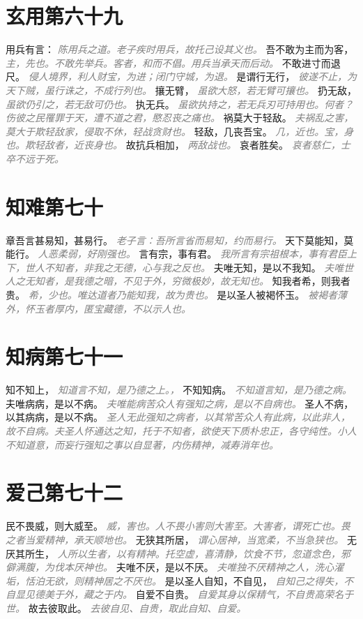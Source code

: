 \documentclass[a4paper,zihao=-4,oneside,landscape,UTF8]{ctexart}
\newcommand{\zhushi}[1]{\scriptsize{\textit{\textcolor{gray}{#1}}}\normalsize}
\begin{document}
\section{玄用第六十九}

用兵有言：
\zhushi{陈用兵之道。老子疾时用兵，故托己设其义也。}
吾不敢为主而为客，
\zhushi{主，先也。不敢先举兵。客者，和而不倡。用兵当承天而后动。}
不敢进寸而退尺。
\zhushi{侵人境界，利人财宝，为进；闭门守城，为退。}
是谓行无行，
\zhushi{彼遂不止，为天下贼，虽行诛之，不成行列也。}
攘无臂，
\zhushi{虽欲大怒，若无臂可攘也。}
扔无敌，
\zhushi{虽欲仍引之，若无敌可仍也。}
执无兵。
\zhushi{虽欲执持之，若无兵刃可持用也。何者？伤彼之民罹罪于天，遭不道之君，愍忍丧之痛也。}
祸莫大于轻敌。
\zhushi{夫祸乱之害，莫大于欺轻敌家，侵取不休，轻战贪财也。}
轻敌，几丧吾宝。
\zhushi{几，近也。宝，身也。欺轻敌者，近丧身也。}
故抗兵相加，
\zhushi{两敌战也。}
哀者胜矣。
\zhushi{哀者慈仁，士卒不远于死。}


\section{知难第七十}

章吾言甚易知，甚易行。
\zhushi{老子言：吾所言省而易知，约而易行。}
天下莫能知，莫能行。
\zhushi{人恶柔弱，好刚强也。}
言有宗，事有君。
\zhushi{我所言有宗祖根本，事有君臣上下，世人不知者，非我之无德，心与我之反也。}
夫唯无知，是以不我知。
\zhushi{夫唯世人之无知者，是我德之暗，不见于外，穷微极妙，故无知也。}
知我者希，则我者贵。
\zhushi{希，少也。唯达道者乃能知我，故为贵也。}
是以圣人被褐怀玉。
\zhushi{被褐者薄外，怀玉者厚内，匿宝藏德，不以示人也。}


\section{知病第七十一}

知不知上，
\zhushi{知道言不知，是乃德之上。，}
不知知病。
\zhushi{不知道言知，是乃德之病。}
夫唯病病，是以不病。
\zhushi{夫唯能病苦众人有强知之病，是以不自病也。}
圣人不病，以其病病，是以不病。
\zhushi{圣人无此强知之病者，以其常苦众人有此病，以此非人，故不自病。夫圣人怀通达之知，托于不知者，欲使天下质朴忠正，各守纯性。小人不知道意，而妄行强知之事以自显著，内伤精神，减寿消年也。}


\section{爱己第七十二}

民不畏威，则大威至。
\zhushi{威，害也。人不畏小害则大害至。大害者，谓死亡也。畏之者当爱精神，承天顺地也。}
无狭其所居，
\zhushi{谓心居神，当宽柔，不当急狭也。}
无厌其所生，
\zhushi{人所以生者，以有精神。托空虚，喜清静，饮食不节，忽道念色，邪僻满腹，为伐本厌神也。}
夫唯不厌，是以不厌。
\zhushi{夫唯独不厌精神之人，洗心濯垢，恬泊无欲，则精神居之不厌也。}
是以圣人自知，不自见，
\zhushi{自知己之得失，不自显见德美于外，藏之于内。}
自爱不自贵。
\zhushi{自爱其身以保精气，不自贵高荣名于世。}
故去彼取此。
\zhushi{去彼自见、自贵，取此自知、自爱。}
\end{document}
